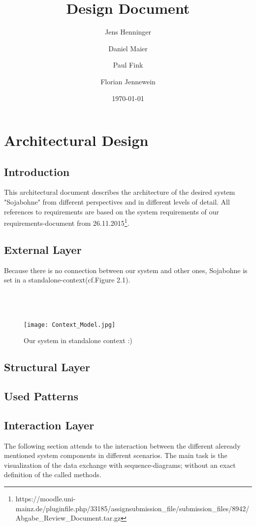 \documentclass{book}
\title{Design Document}
\author{Jens Henninger \and Daniel Maier \and Paul Fink \and Florian Jennewein}
\date{\today}
\begin{document}
\frontmatter
\maketitle
\tableofcontents
\mainmatter
\part{Architectural Design}

\chapter{Introduction}
This architectural document describes the architecture of the desired system "Sojabohne" from different perspectives and in different levels of detail. All references to requirements are based on the system requirements of our requirements-document from 26.11.2015\footnote{https://moodle.uni-mainz.de/pluginfile.php/33185/assignsubmission\_file/submission\_files/8942/Abgabe\_Review\_Document.tar.gz}.
\chapter{External Layer}
Because there is no connection between our system and other ones, Sojabohne is set in a standalone-context(cf.Figure 2.1). \\\\\\\\
\begin{figure}[h]
\centering
\texttt{[image: Context\_Model.jpg]}
\caption{Our system in standalone context :)}
\label{Fig. 1}
\end{figure}
\chapter{Structural Layer}
\chapter{Used Patterns}
\chapter{Interaction Layer}
The following section attends to the interaction between the different aleready mentioned system components in different scenarios. The main task is the visualization of the data exchange with sequence-diagrams; without an exact definition of the called methods.
 
\end{document}
